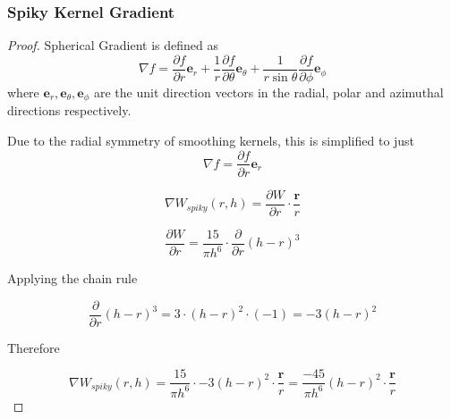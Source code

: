 \documentclass[12pt]{article}
\begin{document}
    \subsubsection{Spiky Kernel Gradient}

    \begin{proof}
        Spherical Gradient is defined as
        $$\nabla f = \frac{\partial{f}}{\partial{r}}\textbf{e}_r + \frac{1}{r}\frac{\partial{f}}{\partial{\theta}}\textbf{e}_{\theta} + \frac{1}{r \sin{\theta}}\frac{\partial{f}}{\partial{\phi}}\textbf{e}_{\phi}$$
        where $\textbf{e}_{r}, \textbf{e}_{\theta}, \textbf{e}_{\phi}$ are the unit direction vectors in the radial, polar and azimuthal directions respectively.

        Due to the radial symmetry of smoothing kernels, this is simplified to just $$\nabla f = \frac{\partial{f}}{\partial{r}}\textbf{e}_r$$

        $$\nabla W_{spiky}(r, h) = \frac{\partial{W}}{\partial{r}} \cdot \frac{\textbf{r}}{r}$$

        $$\frac{\partial{W}}{\partial{r}} = \frac{15}{\pi{h}^6} \cdot \frac{\partial}{\partial{r}} (h - r)^3$$

        Applying the chain rule

        $$\frac{\partial}{\partial{r}} (h - r)^3 = 3 \cdot (h - r)^2 \cdot (-1) = -3(h - r)^2$$

        Therefore

        $$\nabla{W_{spiky}(r, h)} = \frac{15}{\pi{h}^6} \cdot -3(h - r)^2 \cdot \frac{\textbf{r}}{r} = \frac{-45}{\pi{h}^6}(h - r)^2 \cdot \frac{\textbf{r}}{r}$$
    \end{proof}
\end{document}
